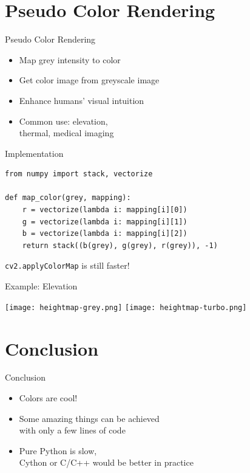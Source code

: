 \documentclass[pdf]{beamer}
\begin{document}
\section{Pseudo Color Rendering}
\frame{\tableofcontents[currentsection]}
\begin{frame}{Pseudo Color Rendering}\Large
  \begin{itemize}
    \item Map grey intensity to color
    \item Get color image from greyscale image
    \item Enhance humans' visual intuition
    \item Common use: elevation,\\
      thermal, medical imaging
  \end{itemize}
\end{frame}

\begin{frame}[fragile]{Implementation}
\begin{verbatim}
from numpy import stack, vectorize

def map_color(grey, mapping):
    r = vectorize(lambda i: mapping[i][0])
    g = vectorize(lambda i: mapping[i][1])
    b = vectorize(lambda i: mapping[i][2])
    return stack((b(grey), g(grey), r(grey)), -1)
\end{verbatim}

\verb|cv2.applyColorMap| is still faster!
\end{frame}

\begin{frame}{Example: Elevation}
  \begin{center}
    \texttt{[image: heightmap-grey.png]}
    \texttt{[image: heightmap-turbo.png]}
  \end{center}
\end{frame}

\section{Conclusion}
\frame{\tableofcontents[currentsection]}
\begin{frame}{Conclusion}\Large
  \begin{itemize}
    \item Colors are cool!
    \item Some amazing things can be achieved\\
      with only a few lines of code
    \item Pure Python is slow,\\
      Cython or C/C++ would be better in practice
  \end{itemize}
\end{frame}
\end{document}
